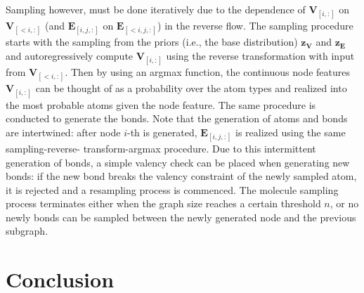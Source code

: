 Sampling however, must be done iteratively due to the dependence of
$\mathbf{V}_{[i,:]}$ on $\mathbf{V}_{[<i,:]}$ (and $\mathbf{E}_{[i,j,:]}$ on
$\mathbf{E}_{[<i,j,:]}$) in the reverse flow. The sampling procedure starts with
the sampling from the priors (i.e., the base distribution)
$\mathbf{z}_{\mathbf{V}}$ and $\mathbf{z}_{\mathbf{E}}$ and autoregressively
compute $\mathbf{V}_{[i,:]}$ using the reverse transformation with input from
$\mathbf{V}_{[<i,:]}$. Then by using an argmax function, the continuous node
features $\mathbf{V}_{[i,:]}$ can be thought of as a probability over the atom
types and realized into the most probable atoms given the node feature. The same
procedure is conducted to generate the bonds. Note that the generation of atoms
and bonds are intertwined: after node $i$-th is generated,
$\mathbf{E}_{[i,j,:]}$ is realized using the same sampling-reverse-
transform-argmax procedure. Due to this intermittent generation of bonds, a
simple valency check can be placed when generating new bonds: if the new bond
breaks the valency constraint of the newly sampled atom, it is rejected and a
resampling process is commenced. The molecule sampling process terminates either
when the graph size reaches a certain threshold $n$, or no newly bonds can be
sampled between the newly generated node and the previous subgraph.

\chapter{Conclusion}
\label{c:conclude}

